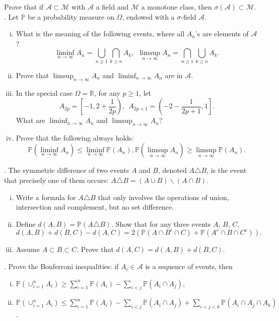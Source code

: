 \documentclass[11pt,reqno]{amsart}
\newcommand{\RR}{{\mathbb R}}
\renewcommand{\P}{{\mathbb{P}}}
\theoremstyle{definition}
\theoremstyle{remark}
\numberwithin{equation}{section}
\begin{document}
Prove that if $\mathcal{A}\subset \mathcal{M}$ with $\mathcal{A}$ a field and $\mathcal{M}$ a monotone class,  then $\sigma(\mathcal{A})\subset \mathcal{M}$.\\


. Let $\mathbb{P}$ be a probability measure on $\Omega$, endowed with a $\sigma$-field $\mathcal{A}$. 
\begin{enumerate}[(i)]
\item What is the meaning of the following events, where all $A_n$'s are elements of $\mathcal{A}$?
$$
\liminf_{n\to\infty}A_n=\bigcup_{n\geq 1}\bigcap_{k\geq n} A_k,\ \
\limsup_{n\to\infty}A_n=\bigcap_{n\geq 1}\bigcup_{k\geq n} A_k.
$$
\item Prove that $\limsup_{n\to\infty} A_n$ and $\liminf_{n\to\infty} A_n$ are in $\mathcal{A}$.
\item In the special case $\Omega=\RR$, for any $p\geq 1$, let
$$
A_{2p}=\left[-1,2+\frac{1}{2p}\right),\ \ A_{2p+1}=\left(-2-\frac{1}{2p+1},1\right].
$$
What are $\liminf_{n\to\infty}A_n$ and $\limsup_{n\to\infty}A_n$?
\item Prove that the following always holds:
$$
\mathbb{P}\left(\liminf_{n\to\infty} A_n\right)\leq \liminf_{n\to\infty}\mathbb{P}\left(A_n\right),
\mathbb{P}\left(\limsup_{n\to\infty} A_n\right)\geq \limsup_{n\to\infty}\mathbb{P}\left(A_n\right).
$$
\end{enumerate}
\vspace{0.2cm}


. The symmetric difference of two events $A$ and $B$, denoted $A\triangle B$, is the event that precisely one of them occurs: $A\triangle B=(A\cup B)\backslash(A\cap B)$.
\begin{enumerate}[(i)]
\item Write a formula for $A\triangle B$ that only involves the operations of union, intersection and complement, but no set difference.
\item Define $d(A,B)=\P(A\triangle B)$. Show that for any three events $A$, $B$, $C$, 
$$
d(A,B)+d(B,C)-d(A,C)
=
2\left(\P\left(A\cap B^c\cap C\right)+\P\left(A^c\cap B\cap C^c\right)\right).
$$
\item Assume $A\subset B\subset C$. Prove that $d(A,C)=d(A,B)+d(B,C)$.\\
\end{enumerate}

.
Prove the Bonferroni inequalities: if $A_i\in \mathcal{A}$ is a sequence of events, then
\begin{enumerate}[(i)]
\item $\P\left(\cup_{i=1}^n A_i\right)\geq \sum_{i=1}^n\P(A_i)-\sum_{i<j}\P(A_i\cap A_j)$,
\item $\P\left(\cup_{i=1}^n A_i\right)\leq \sum_{i=1}^n\P(A_i)-\sum_{i<j}\P(A_i\cap A_j)
+\sum_{i<j<k}\P(A_i\cap A_j\cap A_k)$.
\end{enumerate} 
\end{document}
